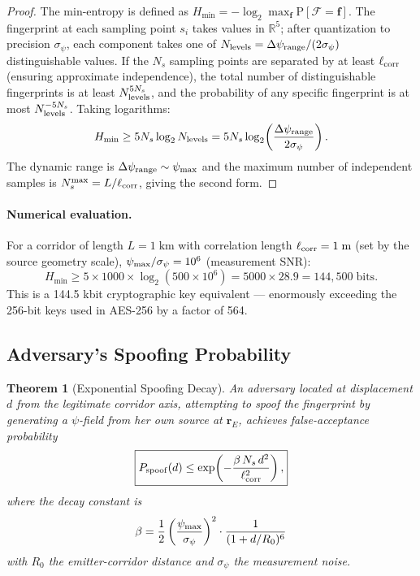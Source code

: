 \documentclass[twocolumn,superscriptaddress,prd,nofootinbib]{revtex4-2}
\newcommand{\Prob}{\mathrm{P}}
\newcommand{\Fingerprint}{\mathcal{F}}
\newcommand{\Hmin}{H_{\min}}
\newtheorem{theorem}{Theorem}
\begin{document}
\begin{proof}
The min-entropy is defined as
$\Hmin = -\log_2\max_{\mathbf{f}} \Prob[\Fingerprint = \mathbf{f}]$.
The fingerprint at each sampling point $s_i$ takes values in
$\mathbb{R}^5$; after quantization to precision $\sigma_\psi$, each
component takes one of $N_{\rm levels} = \Delta\psi_{\rm range}/(2\sigma_\psi)$
distinguishable values. If the $N_s$ sampling points are separated by
at least $\ell_{\rm corr}$ (ensuring approximate independence), the
total number of distinguishable fingerprints is at least
$N_{\rm levels}^{5N_s}$, and the probability of any specific fingerprint
is at most $N_{\rm levels}^{-5N_s}$. Taking logarithms:
\begin{equation}
\Hmin \geq 5N_s\log_2 N_{\rm levels}
= 5N_s\log_2\!\left(\frac{\Delta\psi_{\rm range}}{2\sigma_\psi}\right).
\end{equation}
The dynamic range is $\Delta\psi_{\rm range} \sim \psi_{\rm max}$ and
the maximum number of independent samples is $N_s^{\rm max} = L/\ell_{\rm corr}$,
giving the second form.
\end{proof}

\paragraph{Numerical evaluation.}
For a corridor of length $L = 1\;\text{km}$ with correlation length
$\ell_{\rm corr} = 1\;\text{m}$ (set by the source geometry scale),
$\psi_{\rm max}/\sigma_\psi = 10^6$ (measurement SNR):
\begin{equation}
\Hmin \geq 5\times 1000\times\log_2(500\times 10^6)
= 5000\times 28.9 = 144{,}500\;\text{bits}.
\end{equation}
This is a 144.5 kbit cryptographic key equivalent --- enormously exceeding
the 256-bit keys used in AES-256 by a factor of 564.

\subsection{Adversary's Spoofing Probability}

\begin{theorem}[Exponential Spoofing Decay]\label{thm:spoof-decay}
An adversary located at displacement $d$ from the legitimate corridor
axis, attempting to spoof the fingerprint by generating a $\psi$-field
from her own source at $\mathbf{r}_E$, achieves false-acceptance
probability
\begin{equation}
\boxed{
P_{\rm spoof}(d) \leq \exp\!\left(-\frac{\beta\,N_s\,d^2}{\ell_{\rm corr}^2}\right),
}
\label{eq:spoof-decay}
\end{equation}
where the decay constant is
\begin{equation}
\beta = \frac{1}{2}\left(\frac{\psi_{\rm max}}{\sigma_\psi}\right)^2
\cdot \frac{1}{(1 + d/R_0)^6}
\label{eq:beta}
\end{equation}
with $R_0$ the emitter-corridor distance and $\sigma_\psi$ the
measurement noise.
\end{theorem}
\end{document}
